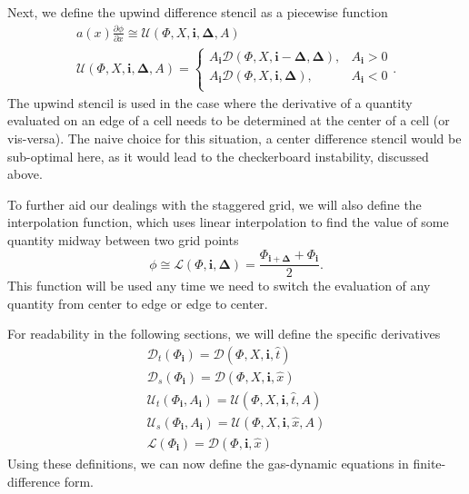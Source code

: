 \documentclass[iop]{emulateapj}
\begin{document}
				Next, we define the upwind difference stencil as a piecewise function
				\begin{gather}
				a(x) \frac{\partial \phi}{\partial x} \cong \mathcal{U}(\Phi, X, \mathbf{i}, \mathbf{\Delta}, A) \\		
				\mathcal{U}(\Phi, X, \mathbf{i}, \mathbf{\Delta}, A) = \begin{cases}
					A_{\mathbf{i}} \mathcal{D}(\Phi, X, \mathbf{i} - \mathbf{\Delta}, \mathbf{\Delta}),  &A_{\mathbf{i}} > 0 \\
					A_{\mathbf{i}} \mathcal{D}(\Phi, X, \mathbf{i}, \mathbf{\Delta}), &A_{\mathbf{i}} < 0 \\
				\end{cases}.
				\end{gather}
				The upwind stencil is used in the case where the derivative of a quantity evaluated on an edge of a cell needs to be determined at the center of a cell (or vis-versa). The naive choice for this situation, a center difference stencil would be sub-optimal here, as it would lead to the checkerboard instability, discussed above.
				
				To further aid our dealings with the staggered grid, we will also define the interpolation function, which uses linear interpolation to find the value of some quantity midway between two grid points
				\begin{equation}
					\phi \cong \mathcal{L}(\Phi, \mathbf{i},\mathbf{\Delta}) = \frac{\Phi_{\mathbf{i} + \mathbf{\Delta}} + \Phi_{\mathbf{i}}}{2}.
				\end{equation}
				This function will be used any time we need to switch the evaluation of any quantity from center to edge or edge to center.
				
				For readability in the following sections, we will define the specific derivatives
				\begin{gather}
					\mathcal{D}_t(\Phi_{\mathbf{i}}) = \mathcal{D}(\Phi, X, \mathbf{i},\hat{t}) \\
					\mathcal{D}_s(\Phi_{\mathbf{i}}) = \mathcal{D}(\Phi, X, \mathbf{i},\hat{x}) \\
					\mathcal{U}_t(\Phi_{\mathbf{i}}, A_{\mathbf{i}}) = \mathcal{U}(\Phi, X, \mathbf{i},\hat{t}, A) \\
					\mathcal{U}_s(\Phi_{\mathbf{i}}, A_{\mathbf{i}}) = \mathcal{U}(\Phi, X, \mathbf{i},\hat{x}, A) \\
					\mathcal{L}(\Phi_{\mathbf{i}}) = \mathcal{D}(\Phi, \mathbf{i},\hat{x})
				\end{gather}
				Using these definitions, we can now define the gas-dynamic equations in finite-difference form.
			
\end{document}
